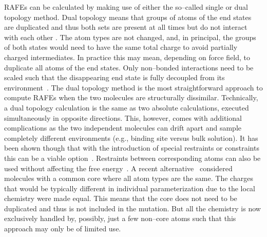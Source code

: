 \documentclass[journal=jctcce,manuscript=article]{achemso}
\begin{document}
RAFEs can be calculated by making use of either the so--called single or dual topology method.
Dual topology means that groups of atoms of the end states are
duplicated and thus both sets are present at all
times but do not interact with each other \cite{doi:10.1021/j100056a020, doi:10.1021/jp981628n}.  The atom types are not changed, and, in principal, the groups
of both states would need to have the same total charge to avoid partially
charged intermediates.  In practice this may mean, depending on force field,
to duplicate all atoms of the end states.  Only non--bonded
interactions need to be scaled such that the disappearing end state
{\color{blue} is fully decoupled from its environment~\cite{doi:10.1021/jp981628n}.}
The dual topology method is the most straightforward approach to compute RAFEs when the two molecules are structurally dissimilar.
Technically, a dual topology calculation is the same as two absolute calculations, executed simultaneously in opposite directions.
This, however, comes with additional complications as the two independent
molecules can drift apart and sample completely different environments (e.g., binding site versus bulk solution).
It has been shown though that with the introduction of
special restraints or constraints this can be a viable
option~\cite{doi:10.1021/ct700081t, rocklin_separated_2013, JCC:Axelsen-Li}.
Restraints between corresponding atoms can also be used without affecting the free
energy~\cite{JCC:Axelsen-Li}.  A recent
alternative~\cite{doi:10.1021/acs.jctc.5b00179} considered molecules with a
common core where all atom types are the same.  The charges that would be
typically different in individual parameterization due to the local chemistry
were made equal.  This means that the core does not need to be duplicated and
thus is not included in the mutation.  But all the chemistry is now exclusively
handled by, possibly, just a few non--core atoms such that this approach may
only be of limited use.
\end{document}
